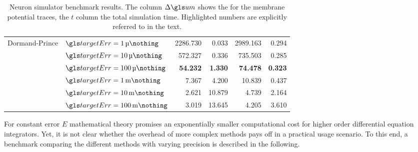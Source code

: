 \begin{table}
\begin{tabular}{p{1.75cm} l r r r r}
		\cmidrule(r){1-2}\cmidrule(r){3-4}\cmidrule(l){5-6}
		\multirow{5}{*}{\parbox{1.5cm}{\raggedleft Dormand-Prince}}
			& $\targetErr = \SI{1}{\micro\nothing}$ & 2286.730 & 0.033 & 2989.163 & 0.294\\
			& $\targetErr = \SI{10}{\micro\nothing}$ & 572.327 & 0.336 & 735.503 & 0.285\\
			& $\targetErr = \SI{100}{\micro\nothing}$ & \textbf{54.232} & \textbf{1.330} & \textbf{74.478} & \textbf{0.323}\\
			& $\targetErr = \SI{1}{\milli\nothing}$ & 7.367 & 4.200 & 10.839 & 0.437\\
			& $\targetErr = \SI{10}{\milli\nothing}$ & 2.621 & 10.879 & 4.739 & 2.164\\
			& $\targetErr = \SI{100}{\milli\nothing}$ & 3.019 & 13.645 & 4.205 & 3.610\\
		\bottomrule
	\end{tabular}
	\caption[Neuron simulator benchmark results]{Neuron simulator benchmark results. The column $\Delta\um$ shows the \RMSE for the membrane potential traces, the $t$ column the total simulation time. Highlighted numbers are explicitly referred to in the text.}
	\label{tbl:integrator_benchmark}
\end{table}

For constant error $E$ mathematical theory promises an exponentially smaller computational cost for higher order differential equation integrators. Yet, it is not clear whether the overhead of more complex methods pays off in a practical usage scenario. To this end, a benchmark comparing the different methods with varying precision is described in the following.

